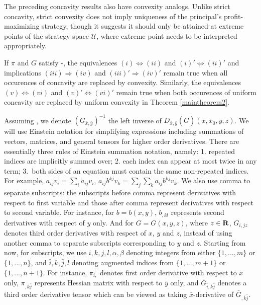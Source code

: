 The preceding concavity results also have convexity analogs. Unlike strict concavity, strict convexity does not
imply uniqueness of the principal's profit-maximizing strategy, though it suggests it should only be attained at 
extreme points of the strategy space $\mathcal U$,  where extreme point needs to be interpreted appropriately.
\medskip


\begin{remark}\label{remarkmaintheorem1}
	If $\pi$ and $G$ satisfy \Gzero-\Gfive,  the equivalences 
	$(i) \Leftrightarrow (ii)$ and $(i)' \Leftrightarrow (ii)'$ and implications $(iii) \Rightarrow (iv)$ and $(iii)' \Rightarrow (iv)'$ remain true when all occurences of concavity are replaced by convexity.
	Similarly,  the equivalences $(v) \Leftrightarrow (vi)$ and $(v)' \Leftrightarrow (vi)'$ remain true when both
	occurences of uniform concavity are replaced by uniform convexity in Theorem \ref{maintheorem2}. 
\end{remark}
\medskip





Assuming \Gsix, we denote $(\bar{G}_{\bar{x}, \bar{y}})^{-1}$ the left inverse of $D_{\bar{x},\bar{y}}(\bar{G})(x,x_0,y,z)$.
We will use Einstein notation for simplifying expressions including summations of vectors, matrices, and general tensors for higher order derivatives. There are essentially three rules of Einstein summation notation, namely: 1. repeated indices are implicitly summed over; 2. each index can appear at most twice in any term; 3.~both sides of an equation must contain the same non-repeated indices. For example, $a_{ij}v_i =\sum_{i}a_{ij}v_i$, $a_{ij}b^{kj}v_k=\sum_{j}\sum_{k}a_{ij}b^{kj}v_k$. We also use comma to separate subscripts: the subscripts before comma represent derivatives with respect to first variable and those after comma represent derivatives with respect to second variable. For instance, for $b=b(x,y)$, $b_{,kl}$ represents second derivatives with respect of $y$ only. And for $G=G(x,y,z)$, where $z\in {\mathbf R}$, $G_{i,jz}$ denotes third order derivatives with respect of $x$, $y$ and $z$, instead of using another comma to separate subscripts corresponding to $y$ and $z$. Starting from now, for subscripts, we use $i,k,j,l, \alpha, \beta$ denoting integers  from either $\{1,...,m\}$ or $\{ 1,..., n\}$, and $\bar{i},\bar{k},\bar{j},\bar{l}$ denoting augmented indices from $\{1,...,m+1\}$ or $ \{1, ..., n+1\}$. For instance, $\pi_{i,}$ denotes first order derivative with respect to $x$ only, $\pi_{,\bar{k}\bar{j}}$ represents Hessian matrix with respect to $\bar{y}$ only, and $\bar{G}_{\bar{i},\bar{k}\bar{j}}$ denotes a third order derivative tensor which can be viewed as taking $\bar{x}$-derivative of $\bar{G}_{,\bar{k}\bar{j}}$.
\medskip

